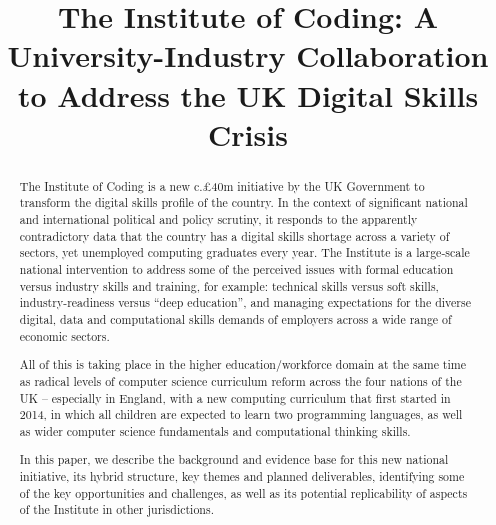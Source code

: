 \documentclass[sigconf]{acmart}
\begin{document}
\title{The Institute of Coding: A University-Industry Collaboration to Address the UK Digital Skills Crisis}

\begin{abstract}
The Institute of Coding is a new c.\pounds40m initiative by the UK
Government to transform the digital skills profile of the country. In
the context of significant national and international political and
policy scrutiny, it responds to the apparently contradictory data that
the country has a digital skills shortage across a variety of sectors,
yet unemployed computing graduates every year. The Institute is a
large-scale national intervention to address some of the perceived
issues with formal education versus industry skills and training, for
example: technical skills versus soft skills, industry-readiness
versus ``deep education'', and managing expectations for the diverse
digital, data and computational skills demands of employers across a
wide range of economic sectors.

All of this is taking place in the higher education/workforce domain
at the same time as radical levels of computer science curriculum
reform across the four nations of the UK -- especially in England,
with a new computing curriculum that first started in 2014, in which
all children are expected to learn two programming languages, as well
as wider computer science fundamentals and computational thinking
skills.

In this paper, we describe the background and evidence base for this
new national initiative, its hybrid structure, key themes and planned
deliverables, identifying some of the key opportunities and
challenges, as well as its potential replicability of aspects of the
Institute in other jurisdictions.
\end{abstract}
\end{document}
